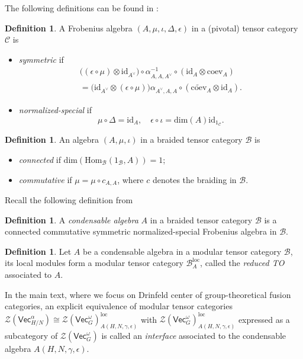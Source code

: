 \documentclass[aps,twocolumn,prx,floatfix,preprintnumbers, nofootinbib,10pt]{revtex4-2}
\numberwithin{equation}{section}
\theoremstyle{definition}
\newtheorem{definition}[theorem]{Definition}
\newcommand{\id}{\text{id}}
\newcommand{\wt}{\widetilde}
\newcommand{\cB}{\mathcal{B}}
\newcommand{\cC}{\mathcal{C}}
\newcommand{\cZ}{\mathcal{Z}}
\newcommand{\Hom}{\text{Hom}}
\renewcommand{\Vec}{\mathsf{Vec}}
\renewcommand{\dim}{\text{dim}}
\newcommand{\eps}{\epsilon}
\begin{document}
The following definitions can be found in \cite{Fuchs:2002cm, Frohlich:2003hm}:
\begin{definition}
    A Frobenius algebra $(A, \mu, \iota, \Delta, \eps)$ in a (pivotal) tensor category $\cC$ is 
    \begin{itemize}
        \item \emph{symmetric} if 
        \begin{equation}
            \begin{split}
                \bigl( (\eps \circ \mu) \otimes \id_{A^\vee} \bigr) \circ \alpha_{A,A,A^\vee}^{-1} \circ ( \id_{A} \otimes \text{coev}_{A}) \\
                = \bigl( \id_{A^\vee} \otimes (\eps \circ \mu) \bigr) \alpha_{A^{\vee}, A, A} \circ (\wt{\text{coev}}_{A}\otimes \id_A).
            \end{split}
        \end{equation}
        \item \emph{normalized-special} if
        \begin{equation}
            \mu \circ \Delta = \id_A, \quad \eps \circ \iota = \dim(A) \id_{1_\cC}.
        \end{equation}
    \end{itemize}
\end{definition}


\begin{definition}
    An algebra $(A, \mu, \iota)$ in a braided tensor category $\cB$ is
    \begin{itemize}
        \item \emph{connected} if $\dim(\Hom_{\cB}(1_\cB, A))=1$; 
        \item \emph{commutative} if $\mu = \mu \circ c_{A,A}$, where $c$ denotes the braiding in $\cB$.
    \end{itemize}
\end{definition}

Recall the following definition from \cite{Kong:2013aya}
\begin{definition}
    A \emph{condensable algebra} $A$ in a braided tensor category $\cB$ is a connected commutative symmetric normalized-special Frobenius algebra in $\cB$.
\end{definition}

\begin{definition}
    Let $A$ be a condensable algebra in a modular tensor category $\cB$, its local modules form a modular tensor category $\cB^\text{loc}_{A}$, called the \emph{reduced TO} associated to $A$.
\end{definition}
In the main text, where we focus on Drinfeld center of group-theoretical fusion categories,
an explicit equivalence of modular tensor categories $\cZ(\Vec_{H/N}^{\alpha}) \cong \cZ(\Vec_G^\omega)_{A(H, N, \gamma, \epsilon)}^{\text{loc}}$ with $\cZ(\Vec_G^\omega)_{A(H, N, \gamma, \epsilon)}^{\text{loc}}$ expressed as a subcategory of $\cZ(\Vec_G^\omega)$ is called an \emph{interface} associated to the condensable algebra $A(H, N, \gamma, \epsilon)$.
\end{document}
